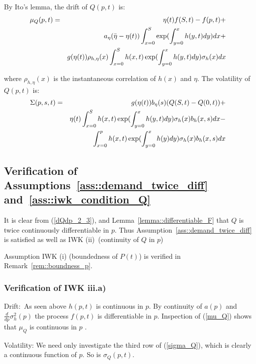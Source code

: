 \documentclass{article}
\begin{document}
By Ito's lemma, the drift of $Q(p,t)$ is:%
\begin{eqnarray}
\mu _{Q}(p,t) &=&\eta (t)f(S,t)-f(p,t)+  \label{mu_Q} \\
&&a_{\eta }(\bar{\eta}-\eta (t))\int_{x=0}^{S}\exp ({%
\int_{y=0}^{x}h(y,t)dy)dx+}  \notag \\
&&g(\eta (t))\rho _{h,\eta }(x)\int_{x=0}^{S}{h(x,t)}\exp ({%
\int_{y=0}^{x}h(y,t)dy)\sigma _{h}(x)dx}  \notag
\end{eqnarray}

where $\rho _{h,\eta }(x)$ is the instantaneous correlation of $h(x)$ and $%
\eta $.  The volatility of $Q(p,t)$ is:%
\begin{eqnarray}
\Sigma (p,s,t) &=&g(\eta (t))b_{\eta }(s)(Q(S,t)-Q(0,t))+  \label{sigma_Q} \\
&&\eta (t)\int_{x=0}^{S}{h(x,t)}\exp ({\int_{y=0}^{x}h(y,t)dy)}\sigma
_{h}(x)b_{h}(x,s)dx-  \notag \\
&&\int_{x=0}^{p}{h(x,t)}\exp ({\int_{y=0}^{x}h(y)dy)}\sigma
_{h}(x)b_{h}(x,s)dx  \notag
\end{eqnarray}

\subsection{Verification of Assumptions~\protect\ref{ass::demand_twice_diff}
and~\protect\ref{ass::iwk_condition_Q}}

It is clear from (\ref{dQdp_2_3}), and Lemma~\ref{lemma::differentiable_F} that $Q$ is twice
continuously differentiable in $p$. Thus Assumption~\ref{ass::demand_twice_diff} is satisfied as well
as IWK (ii)\ (continuity of $Q$ in $p$)

Assumption IWK (i) (boundedness of $P(t)$) is verified in Remark~\ref{rem::boundness_p}.

\subsubsection{Verification of IWK iii.a)}

Drift:\ As seen above $h(p,t)$ is continuous in $p$. By continuity of $a(p)$
and $\frac{d}{dp}\sigma _{h}^{2}(p)$ the process $f(p,t)$ is differentiable
in $p$. Inspection of (\ref{mu_Q}) shows that $\mu _{Q}$ is continuous in $p$%
.

Volatility: We need only investigate the third row of (\ref{sigma_Q}), which
is clearly a continuous function of $p$. So is $\sigma _{Q}(p,t)$.

\bigskip
\end{document}
